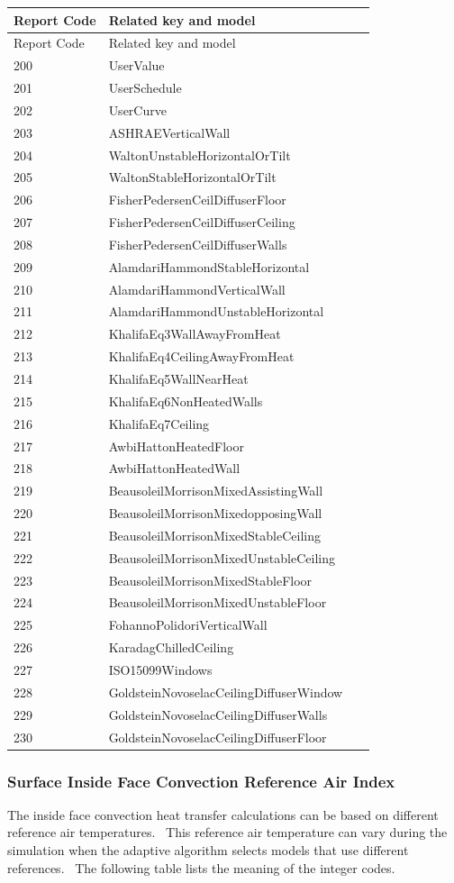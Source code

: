 \begin{longtable}[c]{@{}ll@{}}
\toprule
Report Code & Related key and model \tabularnewline
\midrule
\endfirsthead

\toprule
Report Code & Related key and model \tabularnewline
\midrule
\endhead

200 & UserValue~~~~ \tabularnewline
201 & UserSchedule \tabularnewline
202 & UserCurve~ \tabularnewline
203 & ASHRAEVerticalWall~ \tabularnewline
204 & WaltonUnstableHorizontalOrTilt \tabularnewline
205 & WaltonStableHorizontalOrTilt~~ \tabularnewline
206 & FisherPedersenCeilDiffuserFloor \tabularnewline
207 & FisherPedersenCeilDiffuserCeiling \tabularnewline
208 & FisherPedersenCeilDiffuserWalls~~~~~~~~ \tabularnewline
209 & AlamdariHammondStableHorizontal~~~~~~~~ \tabularnewline
210 & AlamdariHammondVerticalWall~~~~~~~~~~~~ \tabularnewline
211 & AlamdariHammondUnstableHorizontal~~~~~~ \tabularnewline
212 & KhalifaEq3WallAwayFromHeat~~~~~~~~~~~~~ \tabularnewline
213 & KhalifaEq4CeilingAwayFromHeat~~~~~~~~~~ \tabularnewline
214 & KhalifaEq5WallNearHeat~~~~~~~~~~~~~~~~~ \tabularnewline
215 & KhalifaEq6NonHeatedWalls~ \tabularnewline
216 & KhalifaEq7Ceiling~ \tabularnewline
217 & AwbiHattonHeatedFloor~~~~~~~~~~~~~~~~~~ \tabularnewline
218 & AwbiHattonHeatedWall~~~~~~~~~~~~~~~~~~~ \tabularnewline
219 & BeausoleilMorrisonMixedAssistingWall~~~ \tabularnewline
220 & BeausoleilMorrisonMixedopposingWall~~~ \tabularnewline
221 & BeausoleilMorrisonMixedStableCeiling~~~ \tabularnewline
222 & BeausoleilMorrisonMixedUnstableCeiling~ \tabularnewline
223 & BeausoleilMorrisonMixedStableFloor~~~~~ \tabularnewline
224 & BeausoleilMorrisonMixedUnstableFloor~~~ \tabularnewline
225 & FohannoPolidoriVerticalWall~~~~~~~~~~~~ \tabularnewline
226 & KaradagChilledCeiling~~~~~~~~~~~~~~~~~~ \tabularnewline
227 & ISO15099Windows~~~~~~~~~~~~~~~~~~~~~~~~ \tabularnewline
228 & GoldsteinNovoselacCeilingDiffuserWindow \tabularnewline
229 & GoldsteinNovoselacCeilingDiffuserWalls~ \tabularnewline
230 & GoldsteinNovoselacCeilingDiffuserFloor \tabularnewline
\bottomrule
\end{longtable}

\subsubsection{Surface Inside Face Convection Reference Air Index}\label{surface-inside-face-convection-reference-air-index}

The inside face convection heat transfer calculations can be based on different reference air temperatures.~ This reference air temperature can vary during the simulation when the adaptive algorithm selects models that use different references.~ The following table lists the meaning of the integer codes.

